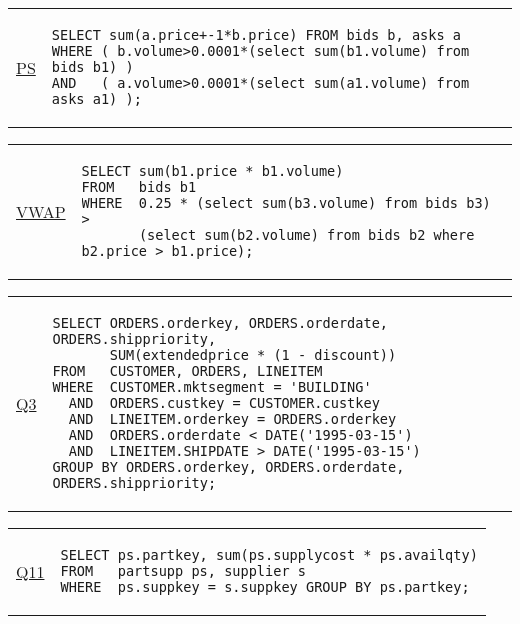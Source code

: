 \hspace{-5mm}\vspace{-8mm}
\begin{tabular}{lp{}}
\begin{rotate}{90}\hspace{-0.75cm}\underline{PS}\end{rotate} &
{\scriptsize
\begin{verbatim}
SELECT sum(a.price+-1*b.price) FROM bids b, asks a
WHERE ( b.volume>0.0001*(select sum(b1.volume) from bids b1) )
AND   ( a.volume>0.0001*(select sum(a1.volume) from asks a1) );
\end{verbatim}
}
\end{tabular}

\hspace{-5mm}\vspace{-8mm}
\begin{tabular}{lp{}}
\begin{rotate}{90}\hspace{-1.25cm}\underline{VWAP}\end{rotate} &
{\scriptsize
\begin{verbatim}
SELECT sum(b1.price * b1.volume) 
FROM   bids b1
WHERE  0.25 * (select sum(b3.volume) from bids b3) >
       (select sum(b2.volume) from bids b2 where b2.price > b1.price);
\end{verbatim}
}
\end{tabular}

\hspace{-5mm}\vspace{-8mm}
\begin{tabular}{lp{}}
\begin{rotate}{90}\hspace{-0.75cm}\underline{Q3}\end{rotate} &
{\scriptsize
\begin{verbatim}
SELECT ORDERS.orderkey, ORDERS.orderdate, ORDERS.shippriority,
       SUM(extendedprice * (1 - discount))
FROM   CUSTOMER, ORDERS, LINEITEM
WHERE  CUSTOMER.mktsegment = 'BUILDING'
  AND  ORDERS.custkey = CUSTOMER.custkey
  AND  LINEITEM.orderkey = ORDERS.orderkey
  AND  ORDERS.orderdate < DATE('1995-03-15')
  AND  LINEITEM.SHIPDATE > DATE('1995-03-15')
GROUP BY ORDERS.orderkey, ORDERS.orderdate, ORDERS.shippriority;
\end{verbatim}}
\end{tabular}

\hspace{-5mm}\vspace{-8mm}
\begin{tabular}{lp{}}
\begin{rotate}{90}\hspace{-0.9cm}\underline{Q11}\end{rotate} &
{\scriptsize
\begin{verbatim}
SELECT ps.partkey, sum(ps.supplycost * ps.availqty)
FROM   partsupp ps, supplier s
WHERE  ps.suppkey = s.suppkey GROUP BY ps.partkey;
\end{verbatim}}
\end{tabular}

